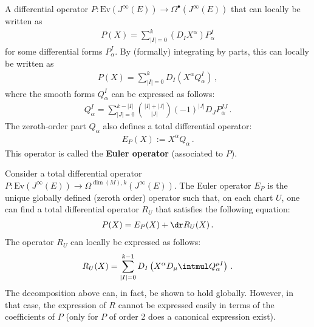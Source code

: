     \begin{property}
        A differential operator $P:\mathrm{Ev}(J^\infty(E))\rightarrow\Omega^\bullet(J^\infty(E))$ that can locally be written as
        \begin{gather}
            P(X) = \sum_{|I|=0}^k\left(D_IX^\alpha\right)P^I_\alpha
        \end{gather}
        for some differential forms $P^I_\alpha$. By (formally) integrating by parts, this can locally be written as
        \begin{gather}
            P(X) = \sum_{|I|=0}^kD_I\left(X^\alpha Q^I_\alpha\right)\,,
        \end{gather}
        where the smooth forms $Q^I_\alpha$ can be expressed as follows:
        \begin{gather}
            \label{var:Q_forms}
            Q^I_\alpha = \sum_{|J|=0}^{k-|I|}\binom{|I|+|J|}{|J|}(-1)^{|J|}D_JP^{IJ}_\alpha\,.
        \end{gather}
        The zeroth-order part $Q_\alpha$ also defines a total differential operator:
        \begin{gather}
            E_P(X) := X^\alpha Q_\alpha\,.
        \end{gather}
        This operator is called the \textbf{Euler operator} (associated to $P$).
    \end{property}

    \begin{property}\label{var:differential_operator_decomposition}
        Consider a total differential operator $P:\mathrm{Ev}(J^\infty(E))\rightarrow\Omega^{\dim(M),k}(J^\infty(E))$. The Euler operator $E_P$ is the unique globally defined (zeroth order) operator such that, on each chart $U$, one can find a total differential operator $R_U$ that satisfies the following equation:
        \begin{gather}
            P(X) = E_P(X) + \dr R_U(X)\,.
        \end{gather}
        The operator $R_U$ can locally be expressed as follows:
        \begin{gather}
            R_U(X) = \sum_{|I|=0}^{k-1}D_I\left(X^\alpha D_\mu\intmul Q^{\mu I}_\alpha\right)\,.
        \end{gather}
        The decomposition above can, in fact, be shown to hold globally. However, in that case, the expression of $R$ cannot be expressed easily in terms of the coefficients of $P$ (only for $P$ of order 2 does a canonical expression exist).
    \end{property}

